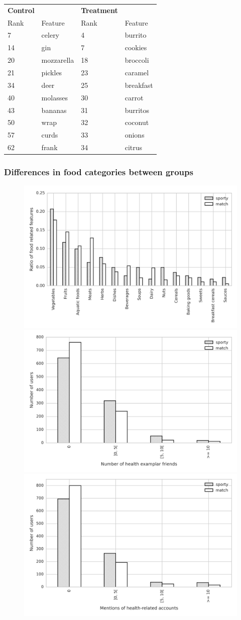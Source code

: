 \documentclass[letterpaper]{article}
\begin{document}
\begin{table}
\begin{tabular}{llll}
\toprule
\textbf{Control} & & \textbf{Treatment} & \\
Rank & Feature & Rank & Feature \\
\cmidrule(lr){1-2} \cmidrule(lr){3-4}
7  &      celery & 4  &    burrito \\
14 &         gin & 7  &    cookies \\
20 &  mozzarella & 18 &   broccoli \\
21 &     pickles & 23 &    caramel \\
34 &        deer & 25 &  breakfast \\
40 &    molasses & 30 &     carrot \\
43 &     bananas & 31 &   burritos \\
50 &        wrap & 32 &    coconut \\
57 &       curds & 33 &     onions \\
62 &       frank & 34 &     citrus \\
\bottomrule
\end{tabular}
\end{table}

\subsubsection{Differences in food categories between groups}

\begin{figure}
  \includegraphics[width=.45\textwidth]{figs/top_food_cats.png}\\
  \includegraphics[width=.45\textwidth]{figs/exemplar_friends.png}\\
  \includegraphics[width=.45\textwidth]{figs/exemplar_mentions.png}\\
\end{figure}
\end{document}
